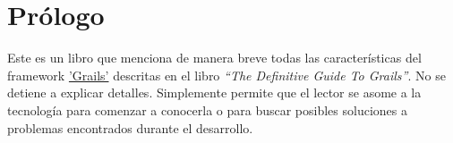 
\chapter{Pr\'ologo}
Este es un libro que menciona de manera breve todas las caracter\'isticas del framework \href{``http://www.grails.org/''}{'Grails'} descritas en el libro \textit{``The Definitive Guide To Grails''}. No se detiene a explicar detalles. Simplemente permite que el lector se asome a la tecnolog\'ia para comenzar a conocerla o para buscar posibles soluciones a problemas encontrados durante el desarrollo.

